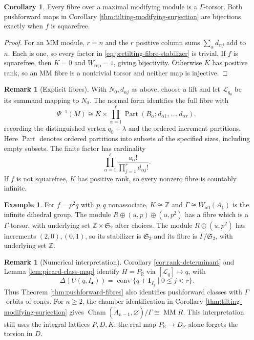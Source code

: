\documentclass[a4paper,reqno]{amsart}
\DeclareMathOperator{\MM}{MM}
\DeclareMathOperator{\Conv}{conv}
\theoremstyle{definition}
\newtheorem{Cor}[Thm]{Corollary}
\newtheorem{Ex}[Thm]{Example}
\newtheorem{Rem}[Thm]{Remark}
\begin{document}
\begin{Cor}\label{cor:pushforward-bijections}
Every fibre over a maximal modifying module is a $\Gamma$-torsor. Both pushforward maps in Corollary \ref{thm:tilting-modifying-surjection} are bijections exactly when $f$ is squarefree.
\end{Cor}
\begin{proof}
For an MM module, $r=n$ and the $r$ positive column sums $\sum_\alpha d_{\alpha j}$ add to $n$. Each is one, so every factor in \eqref{eq:pretilting-fibre-stabilizer} is trivial. If $f$ is squarefree, then $K=0$ and $W_{\mathrm{rep}}=1$, giving bijectivity. Otherwise $K$ has positive rank, so an MM fibre is a nontrivial torsor and neither map is injective.
\end{proof}

\begin{Rem}[Explicit fibres]
With $N_0,d_{\alpha j}$ as above, choose a lift and let $\mathcal L_{q_0}$ be its summand mapping to $N_0$. The normal form identifies the full fibre with
\begin{equation}\label{eq:explicit-pushforward-fibre}
\Psi^{-1}(M)\cong
K\times\prod_{\alpha=1}^\ell
\operatorname{Part}(B_\alpha;d_{\alpha1},\ldots,d_{\alpha r}),
\end{equation}
recording the distinguished vertex $q_0+\lambda$ and the ordered increment partitions. Here $\operatorname{Part}$ denotes ordered partitions into subsets of the specified sizes, including empty subsets. The finite factor has cardinality
\[
\prod_{\alpha=1}^\ell\frac{a_\alpha!}{\prod_{j=1}^r d_{\alpha j}!}.
\]
If $f$ is not squarefree, $K$ has positive rank, so every nonzero fibre is countably infinite.
\end{Rem}

\begin{Ex}\label{ex:repeated-factor-fibre}
For $f=p^2q$ with $p,q$ nonassociate, $K\cong\mathbb Z$ and $\Gamma\cong W_{\mathrm{aff}}(A_1)$ is the infinite dihedral group. The module $R\oplus(u,p)\oplus(u,p^2)$ has a fibre which is a $\Gamma$-torsor, with underlying set $\mathbb Z\times\mathfrak S_2$ after choices. The module $R\oplus(u,p^2)$ has increments $(2,0),(0,1)$, so its stabilizer is $\mathfrak S_2$ and its fibre is $\Gamma/\mathfrak S_2$, with underlying set $\mathbb Z$.
\end{Ex}

\begin{Rem}[Numerical interpretation]\label{cor:pushforward-cones}
Corollary \ref{cor:rank-determinant} and Lemma \ref{lem:picard-class-map} identify $H=P_\mathbb R$ via $[\mathcal L_q]\mapsto q$, with
\[
\Delta(U(q,I_\bullet))=\Conv\{q+\mathbf1_{I_j}\mid0\le j<r\}.
\]
Thus Theorem \ref{thm:pushforward-fibres} also identifies pushforward classes with $\Gamma$-orbits of cones. For $n\ge2$, the chamber identification in Corollary \ref{thm:tilting-modifying-surjection} gives $\operatorname{Cham}(\widetilde A_{n-1},\varnothing)/\Gamma\cong\MM R$. This interpretation still uses the integral lattices $P,D,K$: the real map $P_\mathbb R\to D_\mathbb R$ alone forgets the torsion in $D$.
\end{Rem}
\end{document}
